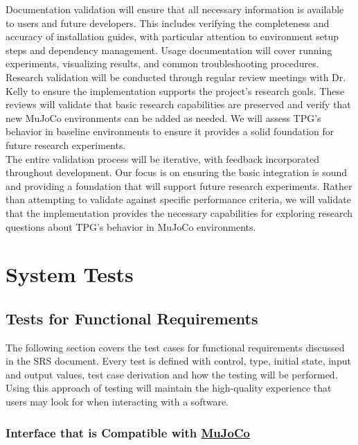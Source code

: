 \documentclass[12pt, titlepage]{article}
\begin{document}
Documentation validation will ensure that all necessary information is available to users and future developers. This includes verifying the completeness and accuracy of installation guides, with particular attention to environment setup steps and dependency management. Usage documentation will cover running experiments, visualizing results, and common troubleshooting procedures. \\

Research validation will be conducted through regular review meetings with Dr. Kelly to ensure the implementation supports the project's research goals. These reviews will validate that basic research capabilities are preserved and verify that new MuJoCo environments can be added as needed. We will assess TPG's behavior in baseline environments to ensure it provides a solid foundation for future research experiments. \\

The entire validation process will be iterative, with feedback incorporated throughout development. Our focus is on ensuring the basic integration is sound and providing a foundation that will support future research experiments. Rather than attempting to validate against specific performance criteria, we will validate that the implementation provides the necessary capabilities for exploring research questions about TPG's behavior in MuJoCo environments.

\section{System Tests}


\subsection{Tests for Functional Requirements}

The following section covers the test cases for functional requirements discussed in the SRS document. Every test is defined with control, type, initial state, input and output values, test case derivation and how the testing will be performed. Using this approach of testing will maintain the high-quality experience that users may look for when interacting with a software.

\subsubsection{Interface that is Compatible with \href{https://mujoco.org/}{MuJoCo}}
\end{document}
